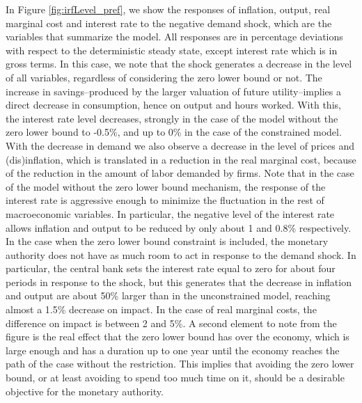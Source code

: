 \documentclass[11pt]{article}
\numberwithin{equation}{section}
\begin{document}
In Figure \ref{fig:irfLevel_pref}, we show the responses of inflation, output, real marginal cost and interest rate to the negative demand shock, which are the variables that summarize the model. All responses are in percentage deviations with respect to the deterministic steady state, except interest rate which is in gross terms. In this case, we note that the shock generates a decrease in the level of all variables, regardless of considering the zero lower bound or not. The increase in savings--produced by the larger valuation of future utility--implies a direct decrease in consumption, hence on output and hours worked. With this, the interest rate level decreases, strongly in the case of the model without the zero lower bound to -0.5\%, and up to 0\% in the case of the constrained model. With the decrease in demand we also observe a decrease in the level of prices and (dis)inflation, which is translated in a reduction in the real marginal cost, because of the reduction in the amount of labor demanded by firms. Note that in the case of the model without the zero lower bound mechanism, the response of the interest rate is aggressive enough to minimize the fluctuation in the rest of macroeconomic variables. In particular, the negative level of the interest rate allows inflation and output to be reduced by only about 1 and 0.8\% respectively. In the case when the zero lower bound constraint is included, the monetary authority does not have as much room to act in response to the demand shock. In particular, the central bank sets the interest rate equal to zero for about four periods in response to the shock, but this generates that the decrease in inflation and output are about 50\% larger than in the unconstrained model, reaching almost a 1.5\% decrease on impact. In the case of real marginal costs, the difference on impact is between 2 and 5\%. A second element to note from the figure is the real effect that the zero lower bound has over the economy, which is large enough and has a duration up to one year until the economy reaches the path of the case without the restriction. This implies that avoiding the zero lower bound, or at least avoiding to spend too much time on it, should be a desirable objective for the monetary authority.
\end{document}

